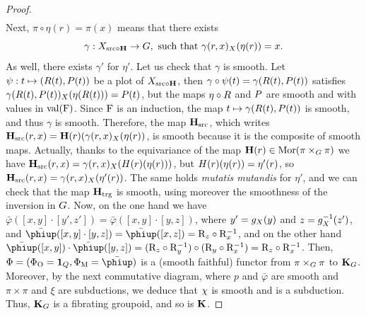 \begin{proof}
$$\begin{array}{ll}
  \end{array}
  $$%
  Next,
  $\pi \circ \eta(r) = \pi(x)$ means that there exists
  $$%
  \gamma : \X_{\source \circ \HH} \to \G, \text{ such that } \gamma(r,x)_\X(\eta(r)) = x.
  $$%
  As well,
  there exists $\gamma'$ for $\eta'$.
  Let us check that $\gamma$ is smooth.
  Let $\psi : t \mapsto (\R(t),\P(t))$ be a plot of $\X_{\source \circ \HH}$,
  then $\gamma \circ \psi(t) = \gamma(\R(t),\P(t))$ satisfies $\gamma(\R(t),\P(t))_\X(\eta(\R(t))) = \P(t)$,
  but the maps $\eta \circ \R$ and $\P$ are smooth and with values in $\Val(\eF)$.
  Since $\eF$ is an induction,
  the map $t \mapsto \gamma(\R(t),\P(t))$ is smooth,
  and thus $\gamma$ is smooth.
  Therefore,
  the map $\HH_\source$,
  which writes $\HH_\source(r,x) = \HH(r)(\gamma(r,x)_\X(\eta(r))$,
  is smooth because it is the composite of smooth maps.
  Actually,
  thanks to the equivariance of the map $\HH(r) \in \Mor(\pi \times_\G \pi)$ we have $\HH_\source(r,x) = \gamma(r,x)_\X(\H(r)(\eta(r)))$,
  but $\H(r)(\eta(r)) = \eta'(r)$,
  so $\HH_\source(r,x) = \gamma(r,x)_\X(\eta'(r))$.
  The same holds {\em mutatis mutandis\/} for $\eta'$,
  and we can check that the map $\HH_\target$ is smooth,
  using moreover the smoothness of the inversion in $\G$.
  Now,
  on the one hand we have $\bar\varphi([x,y] \cdot [y',z']) = \bar\varphi([x,y] \cdot [y,z])$,
  where $y' = g_\X(y)$ and $z = g_\X^{-1}(z')$,
  and $\bar\varphi([x,y] \cdot [y,z]) = \bar\varphi([x,z]) = \eR_z \circ \eR_x^{-1}$,
  and on the other hand $\bar\varphi([x,y]) \cdot \bar\varphi([y,z]) = (\eR_z \circ \eR_y^{-1}) \circ (\eR_y \circ \eR_x^{-1}) = \eR_z \circ \eR_x^{-1}$.
  Then,
  $\Phi = (\Phi_\eO = \id_\Q, \Phi_\eM = \bar\varphi)$ is a (smooth faithful) functor from $\pi \times_\G \pi$ to $\KK_\G$.
  Moreover,
  by the next commutative  diagram,
  where $p$ and $\bar\varphi$ are smooth and $\pi \times \pi$ and $\xi$ are subductions,
  we deduce that $\car$ is smooth and is a subduction.
  Thus,
  $\KK_\G$ is a fibrating groupoid,
  and so is $\KK$.
  

\end{proof}

